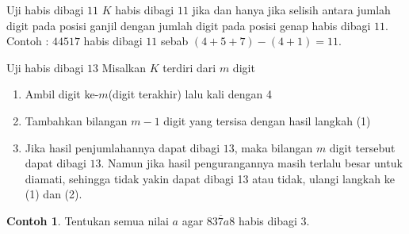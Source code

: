 \documentclass[aspectratio=169]{beamer}
\theoremstyle{definition}
\newtheorem{contoh}{Contoh}
\begin{document}
\begin{frame}{\insertsection}{\insertsubsection}
  \begin{block}{Uji habis dibagi $11$}
    $K$ habis dibagi $11$ jika dan hanya jika selisih antara jumlah digit pada posisi ganjil dengan jumlah digit pada posisi genap habis dibagi $11$.\\
    Contoh : $44517$ habis dibagi $11$ sebab $(4+5+7)-(4+1)=11$.
  \end{block}
  \begin{block}{Uji habis dibagi $13$}
    Misalkan $K$ terdiri dari $m$ digit
    \begin{enumerate}
      \item Ambil digit ke-$m$(digit terakhir) lalu kali dengan 4
      \item Tambahkan bilangan $m-1$ digit yang tersisa dengan hasil langkah (1)
      \item Jika hasil penjumlahannya dapat dibagi $13$, maka bilangan $m$ digit tersebut dapat dibagi $13$. Namun jika hasil pengurangannya masih terlalu besar untuk diamati, sehingga tidak yakin dapat dibagi 13 atau tidak, ulangi langkah ke (1) dan (2).
    \end{enumerate}
  \end{block}
\end{frame}
\begin{frame}{\insertsection}
  \begin{contoh}
    Tentukan semua nilai $a$ agar $\overline{837a8}$ habis dibagi $3$.\\
  \end{contoh}
\end{frame}
\end{document}
